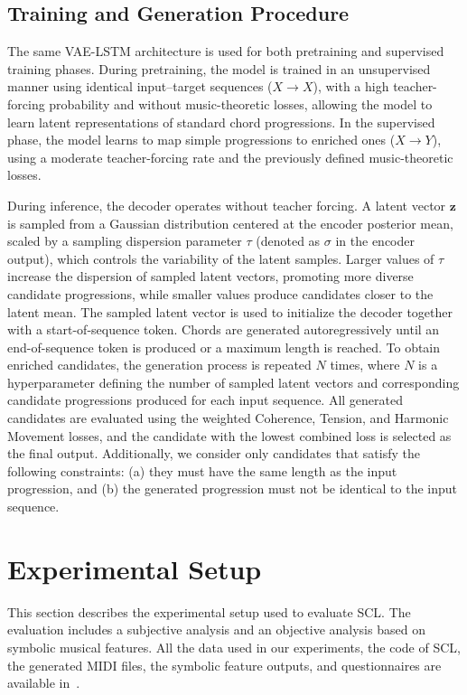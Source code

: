 \documentclass[conference]{IEEEtran}
\begin{document}
\subsection{\textbf{Training and Generation Procedure}}
\label{sec:gene}
The same VAE-LSTM architecture is used for both pretraining and supervised training phases. During pretraining, the model is trained in an unsupervised manner using identical input–target sequences ($X \rightarrow X$), with a high teacher-forcing probability and without music-theoretic losses, allowing the model to learn latent representations of standard chord progressions. In the supervised phase, the model learns to map simple progressions to enriched ones ($X \rightarrow Y$), using a moderate teacher-forcing rate and the previously defined music-theoretic losses.

During inference, the decoder operates without teacher forcing. A latent vector $\mathbf{z}$ is sampled from a Gaussian distribution centered at the encoder posterior mean, scaled by a sampling dispersion parameter $\tau$ (denoted as $\sigma$ in the encoder output), which controls the variability of the latent samples. Larger values of $\tau$ increase the dispersion of sampled latent vectors, promoting more diverse candidate progressions, while smaller values produce candidates closer to the latent mean. The sampled latent vector is used to initialize the decoder together with a start-of-sequence token. Chords are generated autoregressively until an end-of-sequence token is produced or a maximum length is reached. To obtain enriched candidates, the generation process is repeated $N$ times, where $N$ is a hyperparameter defining the number of sampled latent vectors and corresponding candidate progressions produced for each input sequence. All generated candidates are evaluated using the weighted Coherence, Tension, and Harmonic Movement losses, and the candidate with the lowest combined loss is selected as the final output. Additionally, we consider only candidates that satisfy the following constraints: (a) they must have the same length as the input progression, and (b) the generated progression must not be identical to the input sequence.
\section{Experimental Setup}
\label{sec:experimental}
This section describes the experimental setup used to evaluate SCL. The evaluation includes a subjective analysis and an objective analysis based on symbolic musical features.
All the data used in our experiments, the code of SCL, the generated MIDI files, the symbolic feature outputs, and questionnaires are available in~\cite{sclRepo}.
\end{document}
